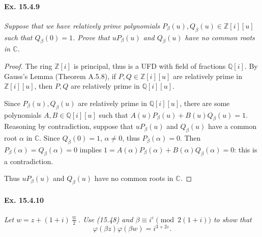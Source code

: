 \documentclass[11pt,a4paper]{article}
\newcommand{\Q}{\mathbb{Q}}
\newcommand{\Z}{\mathbb{Z}}
\newcommand{\C}{\mathbb{C}}
\begin{document}
\paragraph{Ex. 15.4.9}{\it Suppose that we have relatively prime polynomials $P_\beta(u),Q_\beta(u) \in \Z[i][u]$ such that $Q_\beta(0)= 1$. Prove that $uP_\beta(u)$ and $Q_\beta(u)$ have no common roots in $\C$.
}

\begin{proof} 
The ring $\Z[i]$ is principal, thus is a UFD with field of fractions $\Q[i]$. By Gauss's Lemma (Theorem A.5.8), if $P,Q \in \Z[i][u]$ are relatively prime in $\Z[i][u]$, then $P,Q$ are relatively prime in $\Q[i][u]$. 

Since $P_\beta(u),Q_\beta(u)$ are relatively prime in $\Q[i][u]$, there are some polynomials $A,B \in \Q[i][u]$ such that $A(u)P_\beta(u) + B(u) Q_\beta(u) = 1$. Reasoning by contradiction, suppose that $uP_\beta(u)$ and $Q_\beta(u)$ have a common root $\alpha$ in $\C$. Since $Q_\beta(0) = 1$, $\alpha \ne 0$, thus $P_\beta(\alpha) = 0$.  Then $P_\beta(\alpha)= Q_\beta(\alpha) = 0$ implies $1 = A(\alpha) P_\beta(\alpha) + B(\alpha)Q_\beta(\alpha) = 0$: this is a contradiction. 

Thus $uP_\beta(u)$ and $Q_\beta(u)$ have no common roots in $\C$.
\end{proof}

\paragraph{Ex. 15.4.10}{\it Let $w = z + (1+i)\frac{\varpi}{2}$. Use (15.48) and $\beta \equiv i^{\varepsilon} \pmod {2(1+i)}$ to show that
$$\varphi(\beta z) \varphi(\beta w) = i^{3+ 2 \varepsilon}.$$
}
\end{document}
